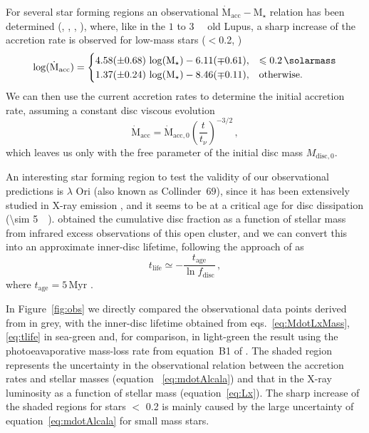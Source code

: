 \documentclass[usenatbib,useAMS,usedcolumn]{mnras}
\begin{document}
For several star forming regions an observational $\dot{\mathrm{M}}_\mathrm{acc}-\mathrm{M}_\star$ relation has been determined (, , , ), where, like in the $1$ to \SI{3}{\mega\year} old Lupus, a sharp increase of the accretion rate is observed for low-mass stars ($<$\SI{0.2}{\solarmass}, )
\begin{equation}\label{eq:mdotAlcala}
    \log(\dot{\mathrm{M}}_\mathrm{acc}) = 
    \begin{cases}
      4.58 (\pm 0.68) \, \log(\mathrm{M}_\star) - 6.11(\mp 0.61), & \leq \SI{0.2}{\solarmass} \\
      1.37 (\pm 0.24) \, \log(\mathrm{M}_\star) - 8.46 (\mp 0.11), & \text{otherwise.}
    \end{cases}
\end{equation}
We can then use the current accretion rates to determine the initial accretion rate, assuming a constant disc viscous evolution
\begin{equation}\label{eq:mdot0}
    \dot{\mathrm{M}}_\mathrm{acc} = \dot{\mathrm{M}}_\mathrm{acc,0} \left(\frac{t}{t_\nu}\right)^{-3/2}\,,
\end{equation}
which leaves us only with the free parameter of the initial disc mass $M_\mathrm{disc,0}$.

An interesting star forming region to test the validity of our observational predictions is $\lambda$ Ori (also known as Collinder~$69$), since it has been extensively studied in X-ray emission , and it seems to be at a critical age for disc dissipation (\SI{\sim 5}{\mega\year}).
 obtained the cumulative disc fraction as a function of stellar mass from infrared excess observations of this open cluster, and we can convert this into an approximate inner-disc lifetime, following the approach of  as
\begin{equation}
    t_\mathrm{life} \simeq -\frac{t_\mathrm{age}}{\ln{f_\mathrm{disc}}}\, ,
\end{equation}
where $t_\mathrm{age} = 5\, \mathrm{Myr}$ .

In Figure~\ref{fig:obs} we directly compared the observational data points derived from  in grey, with the inner-disc lifetime obtained from eqs.~\ref{eq:MdotLxMass}, \ref{eq:tlife} in sea-green and, for comparison, in light-green the result using the photoeavaporative mass-loss rate from equation~B1 of . The shaded region represents the uncertainty in the observational relation between the accretion rates and stellar masses (equation~
\ref{eq:mdotAlcala}) and that in the X-ray luminosity as a function of stellar mass (equation~\ref{eq:Lx}). The sharp increase of the shaded regions for stars $<$ \SI{0.2}{\solarmass} is mainly caused by the large uncertainty of equation~\ref{eq:mdotAlcala} for small mass stars.
\end{document}
